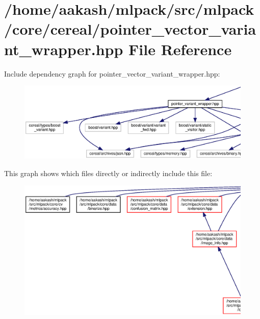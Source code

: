 \section{/home/aakash/mlpack/src/mlpack/core/cereal/pointer\+\_\+vector\+\_\+variant\+\_\+wrapper.hpp File Reference}
\label{pointer__vector__variant__wrapper_8hpp}
Include dependency graph for pointer\+\_\+vector\+\_\+variant\+\_\+wrapper.\+hpp\+:
\nopagebreak
\begin{figure}[H]
\begin{center}
\leavevmode
\includegraphics[width=350pt]{pointer__vector__variant__wrapper_8hpp__incl}
\end{center}
\end{figure}
This graph shows which files directly or indirectly include this file\+:
\nopagebreak
\begin{figure}[H]
\begin{center}
\leavevmode
\includegraphics[width=350pt]{pointer__vector__variant__wrapper_8hpp__dep__incl}
\end{center}
\end{figure}
